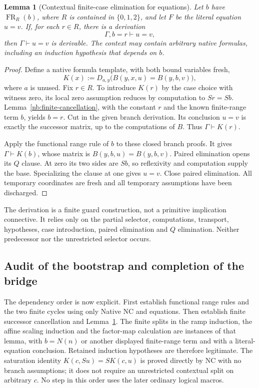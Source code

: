 \documentclass[11pt]{article}
\newtheorem{lemma}[theorem]{Lemma}
\theoremstyle{definition}
\begin{document}
\begin{lemma}[Contextual finite-case elimination for equations]
\label{nb:guarded-cases}
Let $b$ have $\operatorname{FR}_R(b)$, where $R$ is contained in
$\{0,1,2\}$, and let $F$ be the literal equation $u=v$.
If, for each $r\in R$, there is a derivation
\[
                         \Gamma,b=r\vdash u=v,
\]
then $\Gamma\vdash u=v$ is derivable.  The context may contain arbitrary
native formulas, including an induction hypothesis that depends on $b$.
\end{lemma}
\begin{proof}
Define a native formula template, with both bound variables fresh,
\[
 K(x):=D_{a,y}\bigl(B(y,x,u)=B(y,b,v)\bigr),
\]
where $a$ is unused.  Fix $r\in R$.  To introduce $K(r)$ by the case
choice with witness zero, its local zero assumption reduces by
computation to $Sr=Sb$.  Lemma~\ref{nb:finite-cancellation}, with the
constant $r$ and the known finite-range term $b$, yields $b=r$.
Cut in the given branch derivation.  Its conclusion $u=v$ is exactly
the successor matrix, up to the computations of $B$.  Thus
$\Gamma\vdash K(r)$.

Apply the functional range rule of $b$ to these closed branch proofs.
It gives $\Gamma\vdash K(b)$, whose matrix is
$B(y,b,u)=B(y,b,v)$.  Paired elimination opens its $Q$ clause.
At zero its two sides are $Sb$, so reflexivity and computation supply
the base.  Specializing the clause at one gives $u=v$.  Close paired
elimination.  All temporary coordinates are fresh and all temporary
assumptions have been discharged.
\end{proof}

The derivation is a finite guard construction, not a primitive implication
connective.  It relies only on the partial selector, computations,
transport, hypotheses, case introduction, paired elimination and $Q$
elimination.  Neither predecessor nor the unrestricted selector occurs.

\subsection{Audit of the bootstrap and completion of the bridge}

The dependency order is now explicit.  First establish functional range
rules and the two finite cycles using only Native NC and equations.
Then establish finite successor cancellation and
Lemma~\ref{nb:guarded-cases}.  The finite splits in the ramp induction,
the affine scaling induction and the factor-map calculation are instances
of that lemma, with $b=N(n)$ or another displayed finite-range term and
with a literal-equation conclusion.  Retained induction hypotheses are
therefore legitimate.  The saturation identity $K(c,Su)=S K(c,u)$ is
proved directly by NC with no branch assumptions; it does not require
an unrestricted contextual split on arbitrary $c$.  No step in this order
uses the later ordinary logical macros.
\end{document}
